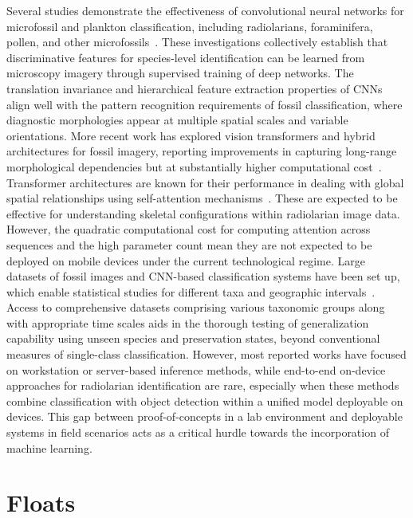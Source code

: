 \documentclass[a4paper,fleqn]{cas-sc}
\begin{document}
Several studies demonstrate the effectiveness of convolutional neural networks for microfossil and plankton classification, including radiolarians, foraminifera, pollen, and other microfossils~\cite{keceli2017automated,dionisio2020automated,marchant2020artificial,lin2017focal}. These investigations collectively establish that discriminative features for species-level identification can be learned from microscopy imagery through supervised training of deep networks. The translation invariance and hierarchical feature extraction properties of CNNs align well with the pattern recognition requirements of fossil classification, where diagnostic morphologies appear at multiple spatial scales and variable orientations. More recent work has explored vision transformers and hybrid architectures for fossil imagery, reporting improvements in capturing long-range morphological dependencies but at substantially higher computational cost~\cite{sun2023deep,hou2023vision}. Transformer architectures are known for their performance in dealing with global spatial relationships using self-attention mechanisms~\cite{dosovitskiy2021image}. These are expected to be effective for understanding skeletal configurations within radiolarian image data. However, the quadratic computational cost for computing attention across sequences and the high parameter count mean they are not expected to be deployed on mobile devices under the current technological regime. Large datasets of fossil images and CNN-based classification systems have been set up, which enable statistical studies for different taxa and geographic intervals~\cite{delima2019digital}. Access to comprehensive datasets comprising various taxonomic groups along with appropriate time scales aids in the thorough testing of generalization capability using unseen species and preservation states, beyond conventional measures of single-class classification. However, most reported works have focused on workstation or server-based inference methods, while end-to-end on-device approaches for radiolarian identification are rare, especially when these methods combine classification with object detection within a unified model deployable on devices. This gap between proof-of-concepts in a lab environment and deployable systems in field scenarios acts as a critical hurdle towards the incorporation of machine learning.

\FloatBarrier

\section{Floats}
\end{document}
